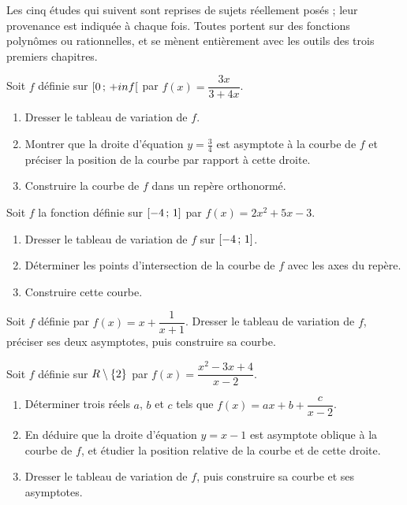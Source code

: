 \begin{annales}
Les cinq études qui suivent sont reprises de sujets réellement posés ; leur
provenance est indiquée à chaque fois. Toutes portent sur des fonctions
polynômes ou rationnelles, et se mènent entièrement avec les outils des trois
premiers chapitres.

Soit $f$ définie sur $\left[0\,;\,+inf\right[$ par
$f(x) = \dfrac{3x}{3+4x}$.
\begin{enumerate}[label=\textbf{\alph*)}, leftmargin=*, itemsep=0.15em]
  \item Dresser le tableau de variation de $f$.
  \item Montrer que la droite d'équation $y = \frac34$ est asymptote à la
        courbe de $f$ et préciser la position de la courbe par rapport à
        cette droite.
  \item Construire la courbe de $f$ dans un repère orthonormé.
\end{enumerate}

Soit $f$ la fonction définie sur $\left[-4\,;\,1\right]$ par
$f(x) = 2x^{2}+5x-3$.
\begin{enumerate}[label=\textbf{\alph*)}, leftmargin=*, itemsep=0.15em]
  \item Dresser le tableau de variation de $f$ sur $\left[-4\,;\,1\right]$.
  \item Déterminer les points d'intersection de la courbe de $f$ avec les axes
        du repère.
  \item Construire cette courbe.
\end{enumerate}

Soit $f$ définie par $f(x) = x+\dfrac{1}{x+1}$. Dresser le tableau de variation
de $f$, préciser ses deux asymptotes, puis construire sa courbe.

Soit $f$ définie sur $R\setminus\{2\}$ par
$f(x) = \dfrac{x^{2}-3x+4}{x-2}$.
\begin{enumerate}[label=\textbf{\alph*)}, leftmargin=*, itemsep=0.15em]
  \item Déterminer trois réels $a$, $b$ et $c$ tels que
        $f(x) = ax+b+\dfrac{c}{x-2}$.
  \item En déduire que la droite d'équation $y = x-1$ est asymptote oblique à
        la courbe de $f$, et étudier la position relative de la courbe et de
        cette droite.
  \item Dresser le tableau de variation de $f$, puis construire sa courbe et
        ses asymptotes.
\end{enumerate}


\end{annales}
